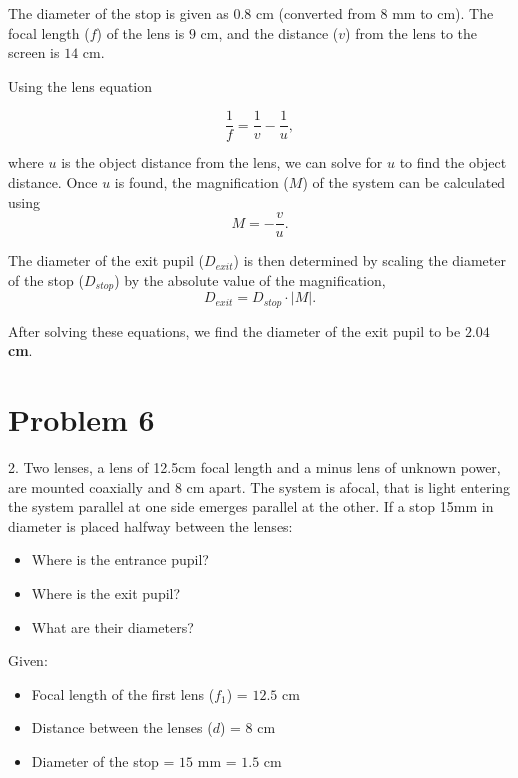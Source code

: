 \documentclass{article}
\begin{document}
The diameter of the stop is given as \(0.8\) cm (converted from \(8\) mm to cm). The focal length (\(f\)) of the lens is \(9\) cm, and the distance (\(v\)) from the lens to the screen is \(14\) cm.

Using the lens equation

\begin{equation}
\frac{1}{f} = \frac{1}{v} - \frac{1}{u},
\end{equation}

where \(u\) is the object distance from the lens, we can solve for \(u\) to find the object distance. Once \(u\) is found, the magnification (\(M\)) of the system can be calculated using
\begin{equation}
M = -\frac{v}{u}.
\end{equation}

The diameter of the exit pupil (\(D_{exit}\)) is then determined by scaling the diameter of the stop (\(D_{stop}\)) by the absolute value of the magnification,
\begin{equation}
D_{exit} = D_{stop} \cdot |M|.
\end{equation}

After solving these equations, we find the diameter of the exit pupil to be \textbf{\(\mathbf{2.04}\) cm}.



\section{Problem 6}
2. Two lenses, a lens of 12.5cm focal length and a minus lens of unknown power, are mounted coaxially and  8 cm apart. The system is afocal, that is light entering the system parallel at one side emerges parallel at the other. If a stop 15mm in diameter is placed halfway between the lenses:

\begin{itemize}
    \item Where is the entrance pupil?
    \item Where is the exit pupil?
    \item What are their diameters?
\end{itemize}



Given:
\begin{itemize}
    \item Focal length of the first lens (\(f_1\)) = \(12.5\) cm
    \item Distance between the lenses (\(d\)) = \(8\) cm
    \item Diameter of the stop = \(15\) mm = \(1.5\) cm
\end{itemize}
\end{document}
